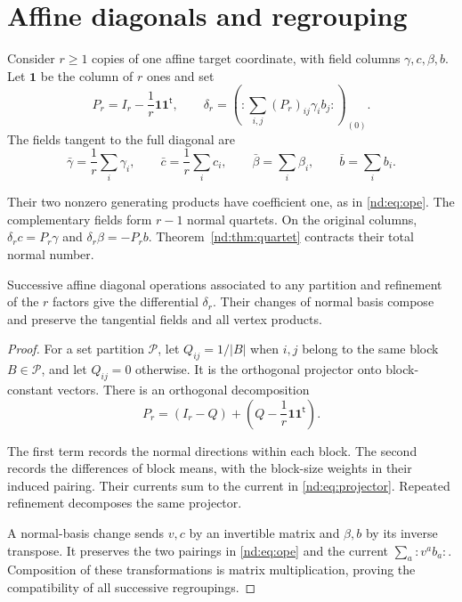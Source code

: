 \section{Affine diagonals and regrouping}
\label{nd:sec:affine}

Consider $r\geq1$ copies of one affine target coordinate, with field
columns $\gamma,c,\beta,b$. Let $\mathbf1$ be the column of $r$ ones
and set
\begin{equation}\label{nd:eq:projector}
 P_r=I_r-\frac1r\mathbf1\mathbf1^{\mathsf t},\qquad
 \delta_r=
 \left(:\sum_{i,j}(P_r)_{ij}\gamma_i b_j:\right)_{(0)}.
\end{equation}
The fields tangent to the full diagonal are
\[
 \bar\gamma=\frac1r\sum_i\gamma_i,\qquad
 \bar c=\frac1r\sum_i c_i,\qquad
 \bar\beta=\sum_i\beta_i,\qquad
 \bar b=\sum_i b_i.
\]

Their two nonzero generating products have coefficient one, as in
\eqref{nd:eq:ope}. The complementary fields form $r-1$ normal
quartets. On the original columns,
$\delta_rc=P_r\gamma$ and $\delta_r\beta=-P_rb$.
Theorem~\ref{nd:thm:quartet} contracts their total normal number.

\begin{proposition}\label{nd:prop:regrouping}
Successive affine diagonal operations associated to any partition
and refinement of the $r$ factors give the differential $\delta_r$.
Their changes of normal basis compose and preserve the tangential
fields and all vertex products.
\end{proposition}

\begin{proof}
For a set partition $\mathcal P$, let $Q_{ij}=1/|B|$ when $i,j$
belong to the same block $B\in\mathcal P$, and let $Q_{ij}=0$
otherwise. It is the orthogonal projector onto block-constant vectors.
There is an orthogonal decomposition
\[
 P_r=(I_r-Q)+\left(Q-\frac1r\mathbf1\mathbf1^{\mathsf t}\right).
\]

The first term records the normal directions within each block.
The second records the differences of block means, with the block-size
weights in their induced pairing. Their currents sum to the current
in \eqref{nd:eq:projector}. Repeated refinement decomposes the same
projector.

A normal-basis change sends $v,c$ by an invertible matrix and
$\beta,b$ by its inverse transpose. It preserves the two pairings
in \eqref{nd:eq:ope} and the current $\sum_a:v^ab_a:$.
Composition of these transformations is matrix multiplication, proving
the compatibility of all successive regroupings.
\end{proof}


